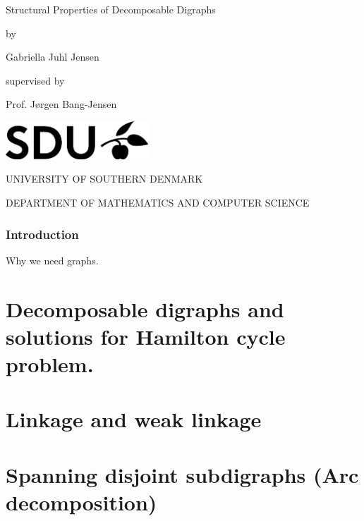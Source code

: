 \documentclass[11pt,oneside,a4paper]{report}
\begin{document}
\begin{titlepage}
	\begin{center}
		\vspace*{1cm}
		\huge{Structural Properties of Decomposable Digraphs}
		
		\vspace*{0.5cm}
		\large{by}
		
		\vspace{0.5cm}
		\Large{Gabriella Juhl Jensen}
		
		\vspace*{0.5cm}
		\normalsize{supervised by}
		
		\vspace{0.5cm}
		\large{Prof. Jørgen Bang-Jensen}
		
		\vfill
		
		\vspace*{0.7cm}
		\includegraphics[width=0.4\textwidth]{sdulogo}
		
		\vspace*{1cm}
		\MakeUppercase{University of southern Denmark}
		
		\vspace*{0.3cm}
		\MakeUppercase{Department of mathematics and computer science}
		
		\vspace*{0.3cm}
		\large{}
	\end{center}
\end{titlepage}
\tableofcontents
	\clearpage
	\section{Introduction}
	Why we need graphs.
	\part{Decomposable digraphs and solutions for Hamilton cycle problem.}
	
	\clearpage
	\part{Linkage and weak linkage}
	
	\clearpage
	\part{Spanning disjoint subdigraphs (Arc decomposition)}
	
	\clearpage



\end{document}
